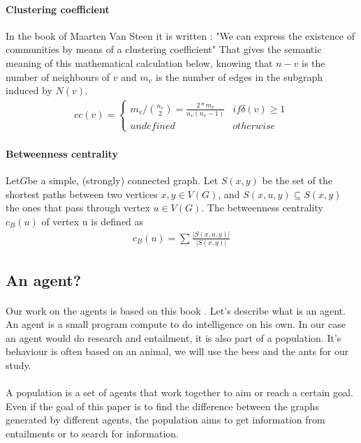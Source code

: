 \documentclass{article}
\begin{document}
		\paragraph{Clustering coefficient}
			In the book of Maarten Van Steen it is written :
			"We can express the existence of communities by means of a clustering coefficient"\cite{Steen10}
			That gives the semantic meaning of this mathematical calculation below,
			knowing that $n-v$ is the number of neighbours of $v$
			and $m_v$ is the number of edges in the subgraph induced by $N(v)$.
		\begin{align*}
			cc(v) = \begin{cases}
				m_v/ \binom{n_v}{2} = \frac{2*m_v}{n_v(n_v-1)} & if \delta(v) \ge 1 \\
				undefined & otherwise
			\end{cases}
		\end{align*}
		\paragraph{Betweenness centrality}
			Let$G$be a simple, (strongly) connected graph.
			Let $S(x, y)$ be the set of the shortest paths between two vertices $x, y \in V(G)$,
			and $S(x, u, y) \subseteq S(x, y)$ the ones that pass through vertex $u \in V (G)$.
			The betweenness centrality $c_B (u)$ of vertex u is defined as
		\begin{align*}
			c_B (u) = \sum \frac{|S(x,u,y)|}{|S(x,y)|}
		\end{align*}
	\subsection{An agent?}
		\paragraph{}
			Our work on the agents is based on this book \cite{Engelbrecht05}.
			Let's describe what is an agent.
			An agent is a small program compute to do intelligence on his own.
			In our case an agent would do research and entailment,
			it is also part of a population.
			It's behaviour is often based on an animal, we will use the bees and the ants for our study.
		\paragraph{}
			A population is a set of agents that work together to aim or reach a certain goal.
			Even if the goal of this paper is to find the difference between the graphs generated by different agents,
			the population aims to get information from entailments or to search for information.
\end{document}
